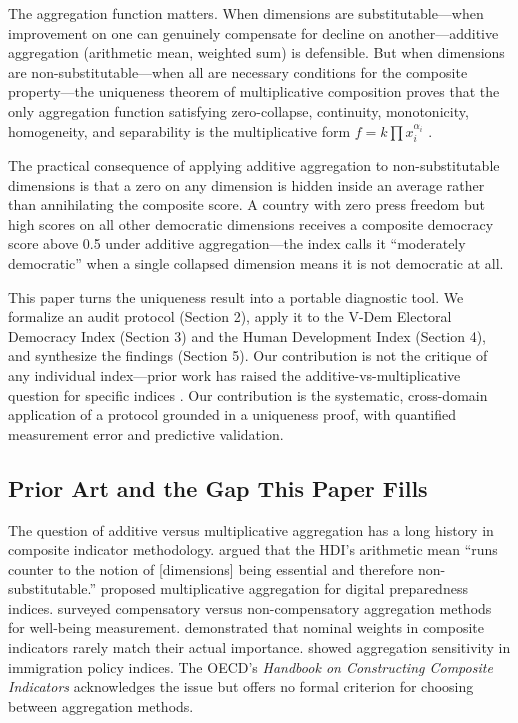 \documentclass[12pt]{article}
\begin{document}
The aggregation function matters. When dimensions are substitutable---when improvement on one can genuinely compensate for decline on another---additive aggregation (arithmetic mean, weighted sum) is defensible. But when dimensions are non-substitutable---when all are necessary conditions for the composite property---the uniqueness theorem of multiplicative composition proves that the only aggregation function satisfying zero-collapse, continuity, monotonicity, homogeneity, and separability is the multiplicative form $f = k \prod x_i^{\alpha_i}$ \citep{kirsch2026mc}.

The practical consequence of applying additive aggregation to non-substitutable dimensions is that a zero on any dimension is hidden inside an average rather than annihilating the composite score. A country with zero press freedom but high scores on all other democratic dimensions receives a composite democracy score above 0.5 under additive aggregation---the index calls it ``moderately democratic'' when a single collapsed dimension means it is not democratic at all.

This paper turns the uniqueness result into a portable diagnostic tool. We formalize an audit protocol (Section 2), apply it to the V-Dem Electoral Democracy Index (Section 3) and the Human Development Index (Section 4), and synthesize the findings (Section 5). Our contribution is not the critique of any individual index---prior work has raised the additive-vs-multiplicative question for specific indices \citep{sagar1998,james2008,munda2013}. Our contribution is the systematic, cross-domain application of a protocol grounded in a uniqueness proof, with quantified measurement error and predictive validation.

\subsection{Prior Art and the Gap This Paper Fills}

The question of additive versus multiplicative aggregation has a long history in composite indicator methodology. \citet{sagar1998} argued that the HDI's arithmetic mean ``runs counter to the notion of [dimensions] being essential and therefore non-substitutable.'' \citet{james2008} proposed multiplicative aggregation for digital preparedness indices. \citet{munda2013} surveyed compensatory versus non-compensatory aggregation methods for well-being measurement. \citet{paruolo2012} demonstrated that nominal weights in composite indicators rarely match their actual importance. \citet{bjerre2019} showed aggregation sensitivity in immigration policy indices. The OECD's \emph{Handbook on Constructing Composite Indicators} \citep{oecd2008} acknowledges the issue but offers no formal criterion for choosing between aggregation methods.
\end{document}
